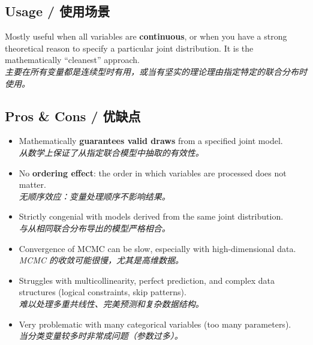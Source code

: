 \documentclass[9pt, a4paper]{article}
\begin{document}
\subsection{Usage / 使用场景}
Mostly useful when all variables are \textbf{continuous}, or when you have a strong theoretical reason to specify a particular joint distribution. It is the mathematically ``cleanest'' approach.\\
\textit{主要在所有变量都是连续型时有用，或当有坚实的理论理由指定特定的联合分布时使用。}

\subsection{Pros \& Cons / 优缺点}
\begin{tcolorbox}[prosbox]
    \begin{itemize}
        \item [\ding{51}] Mathematically \textbf{guarantees valid draws} from a specified joint model.\\
        \textit{从数学上保证了从指定联合模型中抽取的有效性。}
        \item [\ding{51}] No \textbf{ordering effect}: the order in which variables are processed does not matter.\\
        \textit{无顺序效应：变量处理顺序不影响结果。}
        \item [\ding{51}] Strictly congenial with models derived from the same joint distribution.\\
        \textit{与从相同联合分布导出的模型严格相合。}
    \end{itemize}
\end{tcolorbox}
\begin{tcolorbox}[consbox]
    \begin{itemize}
        \item [\ding{55}] Convergence of MCMC can be slow, especially with high-dimensional data.\\
        \textit{MCMC 的收敛可能很慢，尤其是高维数据。}
        \item [\ding{55}] Struggles with multicollinearity, perfect prediction, and complex data structures (logical constraints, skip patterns).\\
        \textit{难以处理多重共线性、完美预测和复杂数据结构。}
        \item [\ding{55}] Very problematic with many categorical variables (too many parameters).\\
        \textit{当分类变量较多时非常成问题（参数过多）。}
    \end{itemize}
\end{tcolorbox}
\end{document}
